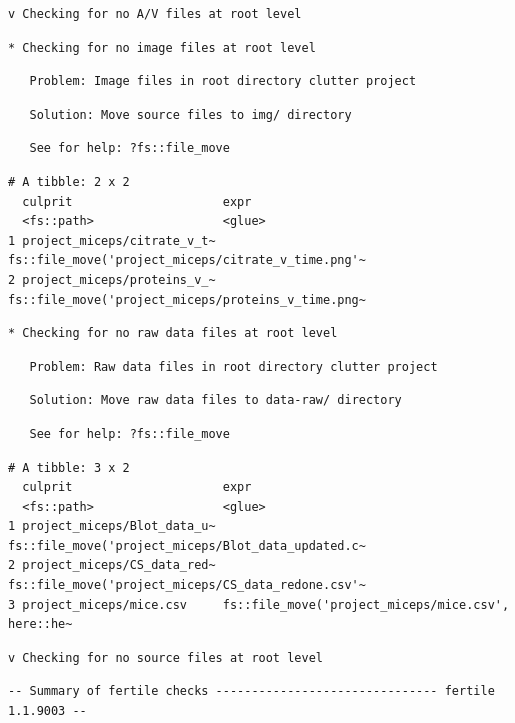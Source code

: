\documentclass[12pt,twoside]{reedthesis}
\begin{document}
\begin{verbatim}
v Checking for no A/V files at root level
\end{verbatim}
\begin{verbatim}
* Checking for no image files at root level
\end{verbatim}
\begin{verbatim}
   Problem: Image files in root directory clutter project
\end{verbatim}
\begin{verbatim}
   Solution: Move source files to img/ directory
\end{verbatim}
\begin{verbatim}
   See for help: ?fs::file_move
\end{verbatim}
\begin{verbatim}
# A tibble: 2 x 2
  culprit                     expr                                              
  <fs::path>                  <glue>                                            
1 project_miceps/citrate_v_t~ fs::file_move('project_miceps/citrate_v_time.png'~
2 project_miceps/proteins_v_~ fs::file_move('project_miceps/proteins_v_time.png~
\end{verbatim}
\begin{verbatim}
* Checking for no raw data files at root level
\end{verbatim}
\begin{verbatim}
   Problem: Raw data files in root directory clutter project
\end{verbatim}
\begin{verbatim}
   Solution: Move raw data files to data-raw/ directory
\end{verbatim}
\begin{verbatim}
   See for help: ?fs::file_move
\end{verbatim}
\begin{verbatim}
# A tibble: 3 x 2
  culprit                     expr                                              
  <fs::path>                  <glue>                                            
1 project_miceps/Blot_data_u~ fs::file_move('project_miceps/Blot_data_updated.c~
2 project_miceps/CS_data_red~ fs::file_move('project_miceps/CS_data_redone.csv'~
3 project_miceps/mice.csv     fs::file_move('project_miceps/mice.csv', here::he~
\end{verbatim}
\begin{verbatim}
v Checking for no source files at root level
\end{verbatim}
\begin{verbatim}
-- Summary of fertile checks ------------------------------- fertile 1.1.9003 --
\end{verbatim}
\end{document}
